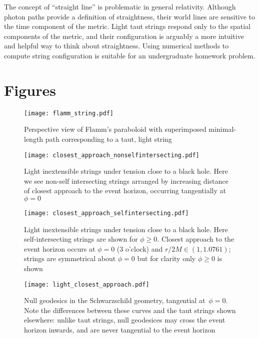 \documentclass[review]{elsarticle}
\begin{document}
The concept of ``straight line'' is problematic in general relativity.
Although photon paths provide a definition of straightness, their
world lines are sensitive to the time component of the metric.  Light
taut strings respond only to the spatial components of the metric, and
their configuration is arguably a more intuitive and helpful way to
think about straightness.  Using numerical methods to compute string
configuration is suitable for an undergraduate homework problem.



\clearpage

\section*{Figures}

\begin{figure}[h!] %
\centering
\texttt{[image: flamm\_string.pdf]}
\caption{Perspective view of Flamm's paraboloid with superimposed minimal-length
  path corresponding to a taut, light string}
\label{flamm}
\end{figure}

\begin{figure}[p] %
\centering
\texttt{[image: closest\_approach\_nonselfintersecting.pdf]}
\caption{Light inextensible strings under tension close to a black
  hole.  Here we see non-self intersecting strings arranged by
  increasing distance of closest approach to the event horizon,
  occurring tangentially at~$\phi=0$}
\label{closest_approach_non_self_intersecting}
\end{figure}

\begin{figure}[p] %
\centering
\texttt{[image: closest\_approach\_selfintersecting.pdf]}
\caption{Light inextensible strings under tension close to a black
  hole.  Here self-intersecting strings are shown for $\phi\geqslant
  0$.  Closest approach to the event horizon occurs at $\phi=0$ (3
  o'clock) and $r/2M\in\left(1,1.0761\right)$; strings are symmetrical
  about $\phi=0$ but for clarity only $\phi\geqslant 0$ is shown}
\label{closest_approach_self_intersecting}
\end{figure}

\begin{figure}[p] %
\centering
\texttt{[image: light\_closest\_approach.pdf]}
\caption{Null geodesics in the Schwarzschild geometry, tangential
  at~$\phi=0$.  Note the differences between these curves and the taut
  strings shown elsewhere: unlike taut strings, null geodesices may
  cross the event horizon inwards, and are never tangential to the
  event horizon}
\label{light_closest_approach}
\end{figure}
\end{document}
